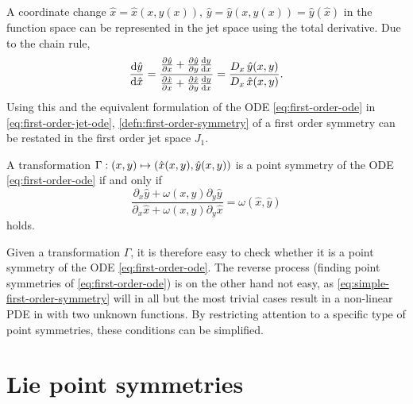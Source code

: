 A coordinate change \(\hat{x} = \hat{x}(x, y(x)),\, \hat{y} = \hat{y}(x, y(x)) = \hat{y}(\hat{x})\) in the function space can be represented in the jet space using the total derivative.
Due to the chain rule,
\begin{equation}
  \dv{\hat{y}}{\hat{x}} = 
  \frac{\pdv{\hat{y}}{x} + \pdv{\hat{y}}{y} \dv{y}{x}}{\pdv{\hat{x}}{x} + \pdv{\hat{x}}{y} \dv{y}{x}} =
  \frac{D_{x}\, \hat{y}(x,y)}{D_{x}\, \hat{x}(x,y)}.
\end{equation}
Using this and the equivalent formulation of the ODE \ref{eq:first-order-ode} in \cref{eq:first-order-jet-ode}, \cref{defn:first-order-symmetry} of a first order symmetry can be restated in the first order jet space \(J_1\).
\begin{lem} \label{lem:simple-first-order-symmetry}
  A transformation \(\Gamma: \pqty{x,y} \mapsto \pqty{\hat{x}(x,y), \hat{y}(x,y)}\) is a point symmetry of the ODE \ref{eq:first-order-ode} if and only if
  \begin{equation} \label{eq:simple-first-order-symmetry}
    \frac{\partial_x \hat{y} + \omega(x,y) \partial_y \hat{y}}{\partial_x \hat{x} + \omega(x,y) \partial_y \hat{x}} = \omega(\hat{x},\hat{y})
  \end{equation}
  holds.
\end{lem} %
Given a transformation \(\Gamma\), it is therefore easy to check whether it is a point symmetry of the ODE \ref{eq:first-order-ode}.
The reverse process (finding point symmetries of \cref{eq:first-order-ode}) is on the other hand not easy, as \cref{eq:simple-first-order-symmetry} will in all but the most trivial cases result in a non-linear PDE in with two unknown functions.
By restricting attention to a specific type of point symmetries, these conditions can be simplified.

\section{Lie point symmetries}


